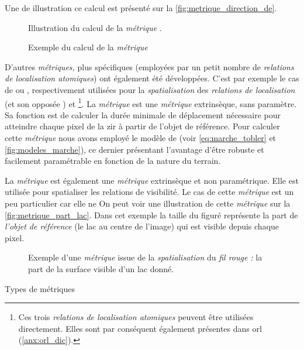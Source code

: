 Une de illustration ce calcul est présenté sur la
\autoref{fig:metrique_direction_de}.

\begin{wrapfigure}{r}{4cm}
  \centering
  
  \caption{Illustration du calcul de la \emph{métrique}
    \protect{}.}
  \label{fig:calc_direction_de}
\end{wrapfigure}

\begin{figure}
  \centering
  
  \caption{Exemple du calcul de la \emph{métrique}
    \protect{}}
  \label{fig:metrique_direction_de}
\end{figure}

D'autres \emph{métriques,} plus spécifiques (\ie employées par un
petit nombre de \emph{relations de localisation atomiques}) ont
également été développées. C'est par exemple le cas de
 ou , respectivement
utilisées pour la \emph{spatialisation} des \emph{relations de
  localisation}  (et son opposée
) et 
\footnote{Ces trois \emph{relations de localisation atomiques} peuvent
  être utilisées directement. Elles sont par conséquent également
  présentes dans \ac{orl} (\autoref{anx:orl_dic}).}. La
\emph{métrique}  est une \emph{métrique}
extrinsèque, sans paramètre. Sa fonction est de calculer la durée
minimale de déplacement nécessaire pour atteindre chaque pixel de la
\ac{zir} à partir de l'objet de référence. Pour calculer cette
\emph{métrique} nous avons employé le modèle de \textcite{Tobler1993}
(voir \autoref{eq:marche_tobler} et \autoref{fig:modeles_marche}), ce
dernier présentant l'avantage d'être robuste et facilement
paramétrable en fonction de la nature du terrain.

La \emph{métrique}  est également une
\emph{métrique} extrinsèque et non paramétrique. Elle est utilisée
pour spatialiser les relations de visibilité. Le cas de cette
\emph{métrique} est un peu particulier car elle ne 
%
On peut voir une illustration de cette \emph{métrique} sur la
\autoref{fig:metrique_part_lac}. Dans cet exemple la taille du figuré
représente la part de \emph{l'objet de référence} (le lac au centre de
l'image) qui est visible depuis chaque pixel.

\begin{figure}
  \centering
  
  \caption{Exemple d'une \emph{métrique} issue de la
    \emph{spatialisation} du \emph{fil rouge :} la part de la surface
    visible d'un lac donné.}
  \label{fig:metrique_part_lac}
\end{figure}

\begin{table}
  \centering
  
  \caption{Types de métriques}
  \label{fig:type_metriques}
\end{table}

